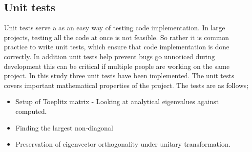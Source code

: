\documentclass[%
reprint,
nofootinbib,
amsmath,amssymb,
aps,
]{revtex4-1}
\begin{document}
\subsection{Unit tests}%
Unit tests serve a as an easy way of testing code implementation. In large projects, testing all the code at once is not feasible. So rather it is common practice to write unit tests, which ensure that code implementation is done correctly. In addition unit tests help prevent bugs go unnoticed during development this can be critical if multiple people are working on the same project. 
In this study three unit tests have been implemented. The unit tests covers important mathematical properties of the project. 
The tests are as follows;
\begin{itemize}
	\item Setup of Toeplitz matrix - Looking at analytical eigenvalues against computed. 
	\item Finding the largest non-diagonal 
	\item Preservation of eigenvector orthogonality under unitary transformation.
\end{itemize}
\end{document}
